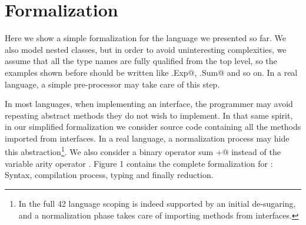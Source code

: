 \saveSpace\section{Formalization}\label{sec:formal}
\saveSpace

Here we show a simple formalization for the language we presented so far.
We also model nested classes, but in order to avoid uninteresting complexities, we assume that
all the type names are fully qualified from the top level, so the examples shown before should be
written like \Q@This.Exp@, \Q@This.Sum@ and so on.
In a real language, a simple pre-processor may take care of this step.

In most languages, when implementing an interface, the programmer may avoid repeating abstract methods
they do not wish to implement.
In that same spirit, in our simplified formalization we consider source code containing
all the methods imported from interfaces. In a real language, a normalization process
may hide this abstraction\footnote{
In the full 42 language scoping is indeed supported by an initial de-sugaring, and a normalization phase takes care of importing methods from interfaces.
}.
We also consider a binary operator sum \Q@+@ instead of the variable arity operator \Q@use@.
Figure 1 contains the complete formalization for \name: Syntax,
compilation process, typing and finally reduction.




